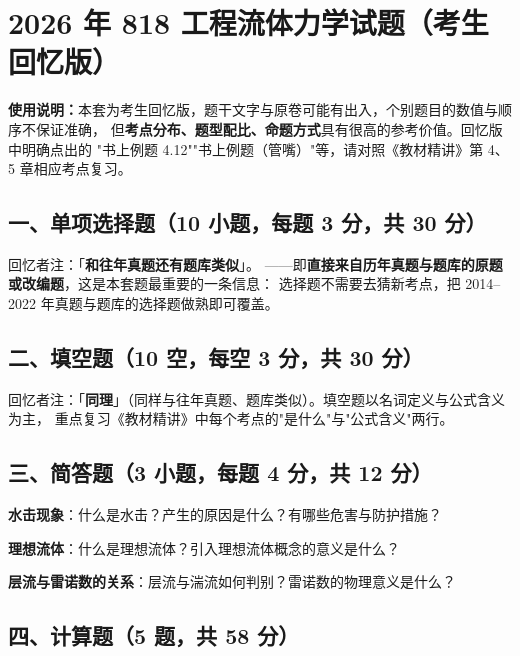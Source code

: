 \chapter{2026 年 818 工程流体力学试题（考生回忆版）}

\begin{tishi}
\textbf{使用说明：}本套为考生回忆版，题干文字与原卷可能有出入，个别题目的数值与顺序不保证准确，
但\textbf{考点分布、题型配比、命题方式}具有很高的参考价值。回忆版中明确点出的
"书上例题 4.12""书上例题（管嘴）"等，请对照《教材精讲》第 4、5 章相应考点复习。
\end{tishi}

\section{一、单项选择题（10 小题，每题 3 分，共 30 分）}

\begin{tishi}
回忆者注：「\textbf{和往年真题还有题库类似}」。
——即\textbf{直接来自历年真题与题库的原题或改编题}，这是本套题最重要的一条信息：
选择题不需要去猜新考点，把 2014--2022 年真题与题库的选择题做熟即可覆盖。
\end{tishi}

\section{二、填空题（10 空，每空 3 分，共 30 分）}

\begin{tishi}
回忆者注：「\textbf{同理}」（同样与往年真题、题库类似）。填空题以名词定义与公式含义为主，
重点复习《教材精讲》中每个考点的"是什么"与"公式含义"两行。
\end{tishi}

\section{三、简答题（3 小题，每题 4 分，共 12 分）}

\begin{ti}
  \item \textbf{水击现象}：什么是水击？产生的原因是什么？有哪些危害与防护措施？
  \item \textbf{理想流体}：什么是理想流体？引入理想流体概念的意义是什么？
  \item \textbf{层流与雷诺数的关系}：层流与湍流如何判别？雷诺数的物理意义是什么？
\end{ti}

\section{四、计算题（5 题，共 58 分）}

